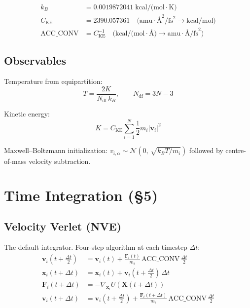 \documentclass[11pt, a4paper]{article}
\begin{document}
\begin{align}
k_B &= 0.0019872041\;\text{kcal/(mol}\cdot\text{K)} \\
C_\text{KE} &= 2390.057361 \quad \text{(amu}\cdot\text{\AA}^2/\text{fs}^2 \to \text{kcal/mol)} \\
\text{ACC\_CONV} &= C_\text{KE}^{-1} \quad \text{(kcal/(mol}\cdot\text{\AA)} \to \text{amu}\cdot\text{\AA/fs}^2)
\end{align}

\subsection{Observables}

Temperature from equipartition:
\begin{equation}
T = \frac{2K}{N_\text{df}\, k_B}, \qquad N_\text{df} = 3N - 3
\end{equation}

Kinetic energy:
\begin{equation}
K = C_\text{KE} \sum_{i=1}^{N} \frac{1}{2} m_i |\mathbf{v}_i|^2
\end{equation}

Maxwell--Boltzmann initialization:
$v_{i,\alpha} \sim \mathcal{N}(0,\, \sqrt{k_B T / m_i})$
followed by centre-of-mass velocity subtraction.


\section{Time Integration (\S5)}

\subsection{Velocity Verlet (NVE)}

The default integrator.  Four-step algorithm at each timestep $\Delta t$:
\begin{align}
\mathbf{v}_i(t{+}\tfrac{\Delta t}{2}) &= \mathbf{v}_i(t) + \frac{\mathbf{F}_i(t)}{m_i}\,\text{ACC\_CONV}\,\frac{\Delta t}{2} \\
\mathbf{x}_i(t{+}\Delta t) &= \mathbf{x}_i(t) + \mathbf{v}_i(t{+}\tfrac{\Delta t}{2})\,\Delta t \\
\mathbf{F}_i(t{+}\Delta t) &= -\nabla_{\mathbf{x}_i} U(\mathbf{X}(t{+}\Delta t)) \\
\mathbf{v}_i(t{+}\Delta t) &= \mathbf{v}_i(t{+}\tfrac{\Delta t}{2}) + \frac{\mathbf{F}_i(t{+}\Delta t)}{m_i}\,\text{ACC\_CONV}\,\frac{\Delta t}{2}
\end{align}
\end{document}
